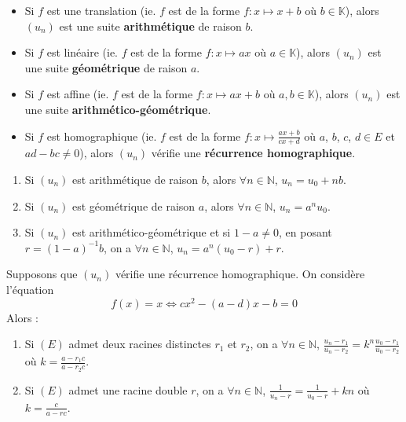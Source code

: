   \begin{definition}
    \begin{itemize}
      \item Si $f$ est une translation (ie. $f$ est de la forme $f : x \mapsto x + b$ où $b \in \mathbb{K}$), alors $(u_n)$ est une suite \textbf{arithmétique} de raison $b$.
      \item Si $f$ est linéaire (ie. $f$ est de la forme $f : x \mapsto ax$ où $a \in \mathbb{K}$), alors $(u_n)$ est une suite \textbf{géométrique} de raison $a$.
      \item Si $f$ est affine (ie. $f$ est de la forme $f : x \mapsto ax + b$ où $a, b \in \mathbb{K}$), alors $(u_n)$ est une suite \textbf{arithmético-géométrique}.
      \item Si $f$ est homographique (ie. $f$ est de la forme $f : x \mapsto \frac{ax + b}{cx + d}$ où $a$, $b$, $c$, $d \in E$ et $ad - bc \neq 0$), alors $(u_n)$ vérifie une \textbf{récurrence homographique}.
    \end{itemize}
  \end{definition}

  \begin{proposition}
    \begin{enumerate}[label=(\roman*)]
      \item Si $(u_n)$ est arithmétique de raison $b$, alors $\forall n \in \mathbb{N}$, $u_n = u_0 + n b$.
      \item Si $(u_n)$ est géométrique de raison $a$, alors $\forall n \in \mathbb{N}$, $u_n = a^n u_0$.
      \item Si $(u_n)$ est arithmético-géométrique et si $1 - a \neq 0$, en posant $r = (1 - a)^{-1} b$, on a $\forall n \in \mathbb{N}$, $u_n = a^n (u_0 - r) + r$.
    \end{enumerate}
  \end{proposition}

  \begin{proposition}
    Supposons que $(u_n)$ vérifie une récurrence homographique. On considère l'équation
    \[ f(x) = x \iff cx^2 - (a-d)x - b = 0 \tag{$E$} \]
    Alors :
    \begin{enumerate}
      \item Si $(E)$ admet deux racines distinctes $r_1$ et $r_2$, on a
      $\forall n \in \mathbb{N}$, $\frac{u_n - r_1}{u_n - r_2} = k^n \frac{u_0 - r_1}{u_0 - r_2}$ où $k = \frac{a - r_1 c}{a - r_2 c}$.
      \item Si $(E)$ admet une racine double $r$, on a $\forall n \in \mathbb{N}$, $\frac{1}{u_n - r} = \frac{1}{u_0 - r} + kn$ où $k = \frac{c}{a - r c}$.
    \end{enumerate}
  \end{proposition}

